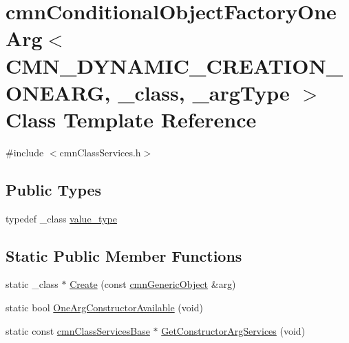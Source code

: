 \hypertarget{classcmn_conditional_object_factory_one_arg_3_01_c_m_n___d_y_n_a_m_i_c___c_r_e_a_t_i_o_n___o_n_ede9b022187ff72195baf5864ecd7352d}{\section{cmn\-Conditional\-Object\-Factory\-One\-Arg$<$ C\-M\-N\-\_\-\-D\-Y\-N\-A\-M\-I\-C\-\_\-\-C\-R\-E\-A\-T\-I\-O\-N\-\_\-\-O\-N\-E\-A\-R\-G, \-\_\-class, \-\_\-arg\-Type $>$ Class Template Reference}
\label{classcmn_conditional_object_factory_one_arg_3_01_c_m_n___d_y_n_a_m_i_c___c_r_e_a_t_i_o_n___o_n_ede9b022187ff72195baf5864ecd7352d}
}


{\ttfamily \#include $<$cmn\-Class\-Services.\-h$>$}

\subsection*{Public Types}
\begin{DoxyCompactItemize}
\item 
typedef \-\_\-class \hyperlink{classcmn_conditional_object_factory_one_arg_3_01_c_m_n___d_y_n_a_m_i_c___c_r_e_a_t_i_o_n___o_n_ede9b022187ff72195baf5864ecd7352d_a33029699c2ed3d54426007bf39dd777c}{value\-\_\-type}
\end{DoxyCompactItemize}
\subsection*{Static Public Member Functions}
\begin{DoxyCompactItemize}
\item 
static \-\_\-class $\ast$ \hyperlink{classcmn_conditional_object_factory_one_arg_3_01_c_m_n___d_y_n_a_m_i_c___c_r_e_a_t_i_o_n___o_n_ede9b022187ff72195baf5864ecd7352d_a4eb48e1f753d88c15a1417423abd9b57}{Create} (const \hyperlink{classcmn_generic_object}{cmn\-Generic\-Object} \&arg)
\item 
static bool \hyperlink{classcmn_conditional_object_factory_one_arg_3_01_c_m_n___d_y_n_a_m_i_c___c_r_e_a_t_i_o_n___o_n_ede9b022187ff72195baf5864ecd7352d_a979e084e1210d3a3b781740aad77d175}{One\-Arg\-Constructor\-Available} (void)
\item 
static const \hyperlink{classcmn_class_services_base}{cmn\-Class\-Services\-Base} $\ast$ \hyperlink{classcmn_conditional_object_factory_one_arg_3_01_c_m_n___d_y_n_a_m_i_c___c_r_e_a_t_i_o_n___o_n_ede9b022187ff72195baf5864ecd7352d_a815deefce508160beb3e1c2a65993227}{Get\-Constructor\-Arg\-Services} (void)
\end{DoxyCompactItemize}


